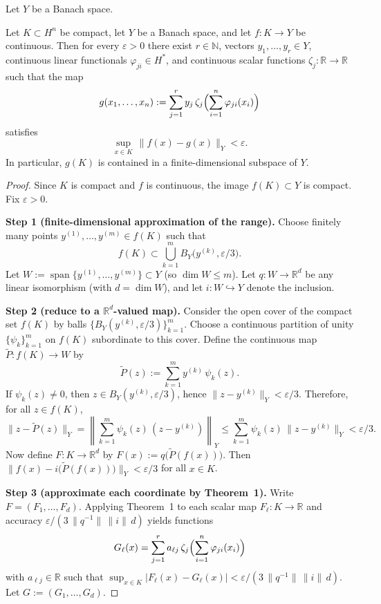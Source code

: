 \documentclass[final,12pt]{colt2026} %
\begin{document}
Let $Y$ be a Banach space.

\begin{theorem}
Let $K\subset H^n$ be compact, let $Y$ be a Banach space, and let $f\colon K\to Y$ be continuous.
Then for every $\varepsilon>0$ there exist $r\in\mathbb{N}$, vectors $y_1,\dots,y_r\in Y$, continuous linear functionals $\varphi_{ji}\in H^*$, and continuous scalar functions $\zeta_j\colon\mathbb{R}\to\mathbb{R}$ such that the map
\[
  g(x_1,\dots,x_n):=\sum_{j=1}^r y_j\,\zeta_j\Bigl(\sum_{i=1}^n \varphi_{ji}(x_i)\Bigr)
\]
satisfies
\[
  \sup_{x\in K}\,\|f(x)-g(x)\|_Y<\varepsilon.
\]
In particular, $g(K)$ is contained in a finite-dimensional subspace of $Y$.
\end{theorem}

\begin{proof}
Since $K$ is compact and $f$ is continuous, the image $f(K)\subset Y$ is compact.
Fix $\varepsilon>0$.

\textbf{Step 1 (finite-dimensional approximation of the range).}
Choose finitely many points $y^{(1)},\dots,y^{(m)}\in f(K)$ such that
\[
  f(K)\subset \bigcup_{k=1}^m B_Y\bigl(y^{(k)},\varepsilon/3\bigr).
\]
Let $W:=\operatorname{span}\{y^{(1)},\dots,y^{(m)}\}\subset Y$ (so $\dim W\le m$).
Let $q\colon W\to\mathbb{R}^d$ be any linear isomorphism (with $d=\dim W$), and let $i\colon W\hookrightarrow Y$ denote the inclusion.

\textbf{Step 2 (reduce to a $\mathbb{R}^d$-valued map).}
Consider the open cover of the compact set $f(K)$ by balls $\{B_Y(y^{(k)},\varepsilon/3)\}_{k=1}^m$.
Choose a continuous partition of unity $\{\psi_k\}_{k=1}^m$ on $f(K)$ subordinate to this cover.
Define the continuous map $\widetilde P\colon f(K)\to W$ by
\[
  \widetilde P(z):=\sum_{k=1}^m y^{(k)}\,\psi_k(z).
\]
If $\psi_k(z)\neq 0$, then $z\in B_Y(y^{(k)},\varepsilon/3)$, hence $\|z-y^{(k)}\|_Y<\varepsilon/3$.
Therefore, for all $z\in f(K)$,
\[
  \|z-\widetilde P(z)\|_Y
  =\left\|\sum_{k=1}^m \psi_k(z)\,(z-y^{(k)})\right\|_Y
  \le \sum_{k=1}^m \psi_k(z)\,\|z-y^{(k)}\|_Y
  <\varepsilon/3.
\]
Now define $F\colon K\to\mathbb{R}^d$ by $F(x):=q\bigl(\widetilde P(f(x))\bigr)$.
Then $\|f(x)-i\bigl(\widetilde P(f(x))\bigr)\|_Y<\varepsilon/3$ for all $x\in K$.

\textbf{Step 3 (approximate each coordinate by Theorem~1).}
Write $F=(F_1,\dots,F_d)$.
Applying Theorem~1 to each scalar map $F_\ell\colon K\to\mathbb{R}$ and accuracy $\varepsilon/(3\,\|q^{-1}\|\,\|i\|\,d)$ yields functions
\[
  G_\ell(x)=\sum_{j=1}^{r} a_{\ell j}\,\zeta_j\Bigl(\sum_{i=1}^n \varphi_{ji}(x_i)\Bigr)
\]
with $a_{\ell j}\in\mathbb{R}$ such that $\sup_{x\in K}|F_\ell(x)-G_\ell(x)|<\varepsilon/(3\,\|q^{-1}\|\,\|i\|\,d)$.
Let $G:=(G_1,\dots,G_d)$.


\end{proof}
\end{document}
